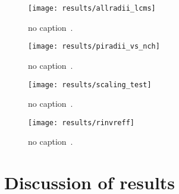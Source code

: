       \begin{figure}[h]
        \centering
        \centerline{\texttt{[image: results/allradii\_lcms]}}
        \caption{no caption~\cite{galazyn}.}
      \label{fig:allradii}
      \end{figure}    

      \begin{figure}[h]
        \centering
        \centerline{\texttt{[image: results/piradii\_vs\_nch]}}
        \caption{no caption~\cite{galazyn}.}
      \label{fig:piradii}
      \end{figure}    

      \begin{figure}[h]
        \centering
        \centerline{\texttt{[image: results/scaling\_test]}}
        \caption{no caption~\cite{galazyn}.}
      \label{fig:piradii}
      \end{figure}    

      \begin{figure}[h]
        \centering
        \centerline{\texttt{[image: results/rinvreff]}}
        \caption{no caption~\cite{galazyn}.}
      \label{fig:piradii}
      \end{figure}

    \FloatBarrier
  \section{Discussion of results}

